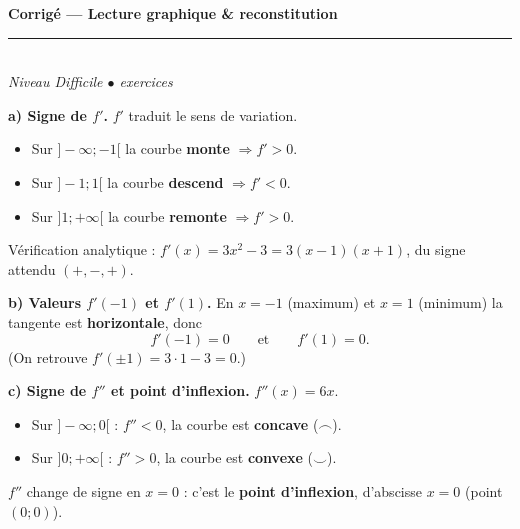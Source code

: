 \documentclass[11pt,a4paper]{article}
\begin{document}
\begin{center}
{\LARGE\bfseries\color{primarydark} Corrigé --- Lecture graphique \& reconstitution}\\[2pt]
{\color{primary}\rule{0.5\textwidth}{1.2pt}}\\[4pt]
{\small\itshape Niveau Difficile \quad$\bullet$ exercices}
\end{center}
\vspace{2mm}

\begin{corr}[1 --- Lecture graphique de $f(x)=x^3-3x$]
\textbf{a) Signe de $f'$.} $f'$ traduit le sens de variation.
\begin{itemize}[leftmargin=6mm,itemsep=1pt]
\item Sur $]-\infty;-1[$ la courbe \textbf{monte} $\Rightarrow f'>0$.
\item Sur $]-1;1[$ la courbe \textbf{descend} $\Rightarrow f'<0$.
\item Sur $]1;+\infty[$ la courbe \textbf{remonte} $\Rightarrow f'>0$.
\end{itemize}
Vérification analytique : $f'(x)=3x^2-3=3(x-1)(x+1)$, du signe attendu $(+,-,+)$.

\smallskip
\textbf{b) Valeurs $f'(-1)$ et $f'(1)$.} En $x=-1$ (maximum) et $x=1$ (minimum) la tangente est \textbf{horizontale}, donc
\[
f'(-1)=0\qquad\text{et}\qquad f'(1)=0.
\]
(On retrouve $f'(\pm 1)=3\cdot 1-3=0$.)

\smallskip
\textbf{c) Signe de $f''$ et point d'inflexion.} $f''(x)=6x$.
\begin{itemize}[leftmargin=6mm,itemsep=1pt]
\item Sur $]-\infty;0[$ : $f''<0$, la courbe est \textbf{concave} ($\smallfrown$).
\item Sur $]0;+\infty[$ : $f''>0$, la courbe est \textbf{convexe} ($\smallsmile$).
\end{itemize}
$f''$ change de signe en $x=0$ : c'est le \textbf{point d'inflexion}, d'abscisse $\boxed{x=0}$ (point $(0;0)$).
\end{corr}
\end{document}
